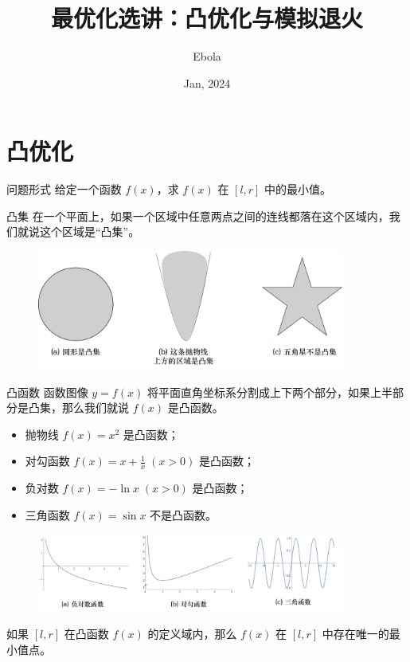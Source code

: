 \documentclass{beamer}
\author{Ebola}
\title{最优化选讲：凸优化与模拟退火}
\institute{
    Institute of Mathematics, \\
    Zhejiang University.
}
\date{Jan, 2024}
\begin{document}
\begin{frame}
    \titlepage
\end{frame}

\begin{frame}
    \tableofcontents[sectionstyle=show,subsectionstyle=show/shaded/hide,subsubsectionstyle=show/shaded/hide]
\end{frame}

\section{凸优化}

\begin{frame}{问题形式}
    \small
    给定一个函数 $f(x)$，求 $f(x)$ 在 $[l,r]$ 中的最小值。
\end{frame}

\begin{frame}{凸集}
    \small
    在一个平面上，如果一个区域中任意两点之间的连线都落在这个区域内，我们就说这个区域是“凸集”。
    \begin{figure}[H]
        \centering
        \includegraphics[width=0.9\textwidth]{pic/convexRegion.png}
    \end{figure}
\end{frame}

\begin{frame}{凸函数}
    \small
    函数图像 $y=f(x)$ 将平面直角坐标系分割成上下两个部分，如果上半部分是凸集，那么我们就说 $f(x)$ 是凸函数。 
    \begin{itemize}
        \item 抛物线 $f(x)=x^2$ 是凸函数；
        \item 对勾函数 $f(x)=x+\frac{1}{x}\;(x>0)$ 是凸函数；
        \item 负对数 $f(x)=-\ln x\; (x>0)$ 是凸函数；
        \item 三角函数 $f(x)=\sin x$ 不是凸函数。
    \end{itemize}

    \begin{figure}[H]
        \centering
        \includegraphics[width=0.9\textwidth]{pic/convexFunction.png}
    \end{figure}

    \pause
    如果 $[l,r]$ 在凸函数 $f(x)$ 的定义域内，那么 $f(x)$ 在 $[l,r]$ 中存在唯一的最小值点。
\end{frame}
\end{document}
